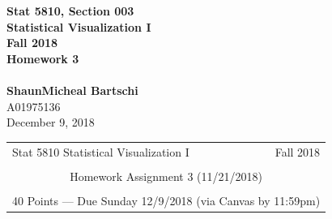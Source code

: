 \documentclass[12pt,letterpaper,final]{article}
\begin{document}


\begin{titlepage}
\vspace*{4.5cm}
\begin{center}
{\LARGE \bf Stat 5810, Section 003} \\[0.5cm]
{\LARGE \bf Statistical Visualization I} \\[0.5cm]
{\LARGE \bf Fall 2018} \\[0.5cm]
{\LARGE \bf Homework 3} \\[0.5cm]
~ \\[2cm]
{\bf ShaunMicheal Bartschi} \\[0.3cm]
{A01975136} \\[0.3cm]
{December 9, 2018} \\[0.3cm]
\end{center}

\thispagestyle{empty}
\vfill
\end{titlepage}

\begin{table}\centering
\begin{tabular*}{6.15in}{@{\extracolsep{\fill}}|llr|} \hline
Stat 5810 Statistical Visualization I & \hspace*{0.5 in} & Fall 2018 \\
 & & \\
\multicolumn{3}{|c|}{
Homework Assignment 3 (11/21/2018)} \\
 & & \\
\multicolumn{3}{|c|}{
40 Points --- Due Sunday 12/9/2018 (via Canvas by 11:59pm)} \\
\hline
\end{tabular*}
\end{table}
\end{document}
